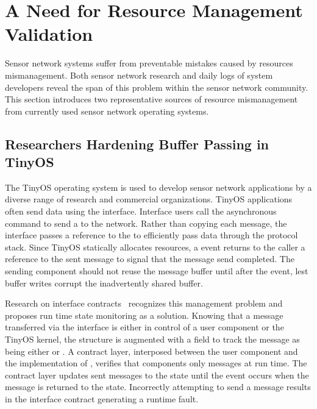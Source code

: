\section{A Need for Resource Management Validation}
\label{sec:mot}

Sensor network systems suffer from preventable mistakes caused by resources
mismanagement.
%
Both sensor network research and daily logs of system developers reveal the
span of this problem within the sensor network community.
%
This section introduces two representative sources of resource mismanagement
from currently used sensor network operating systems.



\subsection{Researchers Hardening Buffer Passing in TinyOS}
\label{ssec:tinyos}


The TinyOS operating system is used to develop sensor network applications by
a diverse range of research and commercial organizations.
%
TinyOS applications often send data using the  interface.
%
Interface users call the asynchronous  command to send a
 to the network.
%
Rather than copying each message, the  interface passes a
reference to the  to efficiently pass data through the protocol
stack.
%
Since TinyOS statically allocates resources, a  event returns
to the caller a reference to the sent message to signal that the message send
completed.
%
The sending component should not reuse the message buffer until after the
 event, lest buffer writes corrupt the inadvertently shared
buffer.



Research on interface contracts~\cite{archer07interface} recognizes this
management problem and proposes run time state monitoring as a solution.
%
Knowing that a message transferred via the  interface is
either in control of a user component or the TinyOS kernel, the
 structure is augmented with a  field to
track the message as being either  or .
%
A contract layer, interposed between the user component and the
implementation of , verifies that components only 
 messages at run time.
%
The contract layer updates sent messages to the  state until
the  event occurs when the message is returned to the
 state.
%
Incorrectly attempting to send a  message results in the
interface contract generating a runtime fault.




